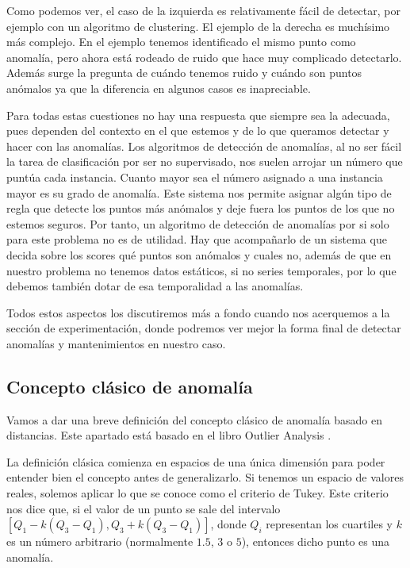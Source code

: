 Como podemos ver, el caso de la izquierda es relativamente fácil de detectar, por ejemplo con un algoritmo de clustering. El ejemplo de la derecha es muchísimo más complejo. En el ejemplo tenemos identificado el mismo punto como anomalía, pero ahora está rodeado de ruido que hace muy complicado detectarlo. Además surge la pregunta de cuándo tenemos ruido y cuándo son puntos anómalos ya que la diferencia en algunos casos es inapreciable.

Para todas estas cuestiones no hay una respuesta que siempre sea la adecuada, pues dependen del contexto en el que estemos y de lo que queramos detectar y hacer con las anomalías. Los algoritmos de detección de anomalías, al no ser fácil la tarea de clasificación por ser no supervisado, nos suelen arrojar un número que puntúa cada instancia. Cuanto mayor sea el número asignado a una instancia mayor es su grado de anomalía. Este sistema nos permite asignar algún tipo de regla que detecte los puntos más anómalos y deje fuera los puntos de los que no estemos seguros. Por tanto, un algoritmo de detección de anomalías por si solo para este problema no es de utilidad. Hay que acompañarlo de un sistema que decida sobre los scores qué puntos son anómalos y cuales no, además de que en nuestro problema no tenemos datos estáticos, si no series temporales, por lo que debemos también dotar de esa temporalidad a las anomalías.

Todos estos aspectos los discutiremos más a fondo cuando nos acerquemos a la sección de experimentación, donde podremos ver mejor la forma final de detectar anomalías y mantenimientos en nuestro caso.

\subsection{Concepto clásico de anomalía}

Vamos a dar una breve definición del concepto clásico de anomalía basado en distancias. Este apartado está basado en el libro Outlier Analysis \cite{aggarwal_outlier_2017}.

La definición clásica comienza en espacios de una única dimensión para poder entender bien el concepto antes de generalizarlo. Si tenemos un espacio de valores reales, solemos aplicar lo que se conoce como el criterio de Tukey. Este criterio nos dice que, si el valor de un punto se sale del intervalo $[Q_1 - k(Q_3 - Q_1), Q_3 + k(Q_3 - Q_1)]$, donde $Q_i$ representan los cuartiles y $k$ es un número arbitrario (normalmente $1.5$, $3$ o $5$), entonces dicho punto es una anomalía.

